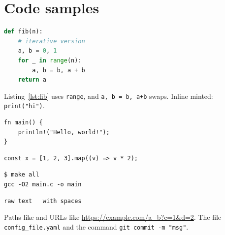 \documentclass{article}
\begin{document}
\section{Code samples}

\begin{lstlisting}[language=Python, caption={Fibonacci in Python}, label={lst:fib}]
def fib(n):
    # iterative version
    a, b = 0, 1
    for _ in range(n):
        a, b = b, a + b
    return a
\end{lstlisting}

Listing~\ref{lst:fib} uses \lstinline|range|, and \verb|a, b = b, a+b| swaps. Inline minted: \texttt{print("hi")}.

\begin{verbatim}
fn main() {
    println!("Hello, world!");
}
\end{verbatim}

\begin{listing}[ht]
\begin{verbatim}
const x = [1, 2, 3].map((v) => v * 2);
\end{verbatim}
\caption{Doubling in JavaScript}
\label{lst:js}
\end{listing}

\begin{Verbatim}[frame=single, fontsize=\small]
$ make all
gcc -O2 main.c -o main
\end{Verbatim}

\begin{verbatim}
raw text   with spaces
\end{verbatim}

Paths like  and URLs like \url{https://example.com/a_b?c=1&d=2}.
The file \texttt{config\_file.yaml} and the command \texttt{git commit -m "msg"}.
\lstlistoflistings
\end{document}

